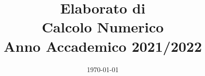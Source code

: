 \documentclass[a4paper]{article}
\date{\today}
\begin{document}
\title{
  \vspace{2cm}
  Elaborato di\\
  \textbf{Calcolo Numerico}\\
  Anno Accademico 2021/2022
  \vspace{3cm}
}

\author{\authors{}}


\maketitle
\newpage
\tableofcontents
\newpage
\listoffigures
\listoftables


\newpage







\newpage
{}
\end{document}
